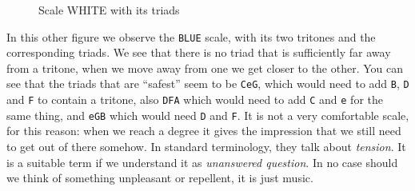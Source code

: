 \documentclass[]{report}
\begin{document}
\begin{figure}[H]
\begin{subfigure}{1\textwidth}

\end{subfigure}
\caption{Scale \textsf{WHITE} with its triads}\label{fig:white-scale-with-its-triads}
\end{figure}
In this other figure we observe the \texttt{BLUE} scale, with its two tritones and the corresponding triads. We see that there is no triad that is sufficiently far away from a tritone, when we move away from one we get closer to the other. You can see that the triads that are ``safest'' seem to be \texttt{CeG}, which would need to add \texttt{B}, \texttt{D} and \texttt{F} to contain a tritone, also \texttt{DFA} which would need to add \texttt{C} and \texttt{e} for the same thing, and \texttt{eGB} which would need \texttt{D} and \texttt{F}.
It is not a very comfortable scale, for this reason: when we reach a degree it gives the impression that we still need to get out of there somehow. In standard terminology, they talk about \emph{tension}. It is a suitable term if we understand it as \emph{unanswered question}. In no case should we think of something unpleasant or repellent, it is just music.
\end{document}

